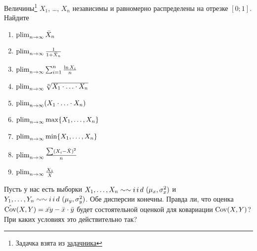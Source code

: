 \documentclass[12pt, a4paper, oneside]{article}
\begin{document}


\begin{problem}{}
Величины\footnote{Задачка взята из \href{https://github.com/bdemeshev/probability_pro}{задачника}} $X_1$, \ldots, $X_n$ независимы и равномерно распределены на отрезке $[0;1]$. Найдите 
\begin{multicols}{2}
\begin{enumerate}
    \item $\operatorname*{plim}_{n \to \infty} \bar X_n$
    \item $\operatorname*{plim}_{n \to \infty} \frac{1}{1 +\bar X_n}$
    \item $\operatorname*{plim}_{n \to \infty} \sum_{i=1}^n \frac{\ln X_i}{n}$
    \item $\operatorname*{plim}_{n \to \infty} \sqrt[n]{X_1 \cdot \ldots \cdot  X_n}$
    \item $\operatorname*{plim}_{n \to \infty} (X_1 \cdot \ldots \cdot X_n)$
    \item $\operatorname*{plim}_{n \to \infty} \max\{X_1, \ldots, X_n \}$
    \item $\operatorname*{plim}_{n \to \infty} \min \{X_1, \ldots, X_n\}$
    \item $\operatorname*{plim}_{n \to \infty} \frac{\sum (X_i - \bar{X})^2}{n}$
    \item $\operatorname*{plim}_{n \to \infty} \frac{X_1}{\bar{X}}$
\end{enumerate}
\end{multicols}
\end{problem} 


\begin{problem}{}
Пусть у нас есть выборки $X_1, \ldots, X_n \sim \sim i\,i\,d\,\, (\mu_x, \sigma^2_x)$ и $Y_1, \ldots, Y_n \sim \sim i\,i\,d\,\, (\mu_y, \sigma^2_y)$. Обе дисперсии конечны. Правда ли, что оценка $\hat{\operatorname{Cov}}(X,Y) = \bar{xy} - \bar{x}\cdot\bar{y}$ будет состоятельной оценкой для ковариации $\operatorname{Cov}(X,Y)$?  При каких условиях это действительно так? 
\end{problem} 
\end{document}

